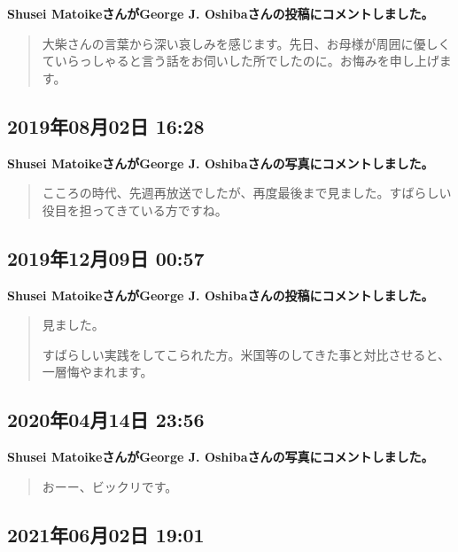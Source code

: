 \textbf{Shusei MatoikeさんがGeorge J. Oshibaさんの投稿にコメントしました。}

\begin{quote}
大柴さんの言葉から深い哀しみを感じます。先日、お母様が周囲に優しくていらっしゃると言う話をお伺いした所でしたのに。お悔みを申し上げます。
\end{quote}

\subsection*{2019年08月02日 16:28}

\textbf{Shusei MatoikeさんがGeorge J. Oshibaさんの写真にコメントしました。}

\begin{quote}
こころの時代、先週再放送でしたが、再度最後まで見ました。すばらしい役目を担ってきている方ですね。
\end{quote}

\subsection*{2019年12月09日 00:57}

\textbf{Shusei MatoikeさんがGeorge J. Oshibaさんの投稿にコメントしました。}

\begin{quote}
見ました。

すばらしい実践をしてこられた方。米国等のしてきた事と対比させると、一層悔やまれます。
\end{quote}

\subsection*{2020年04月14日 23:56}

\textbf{Shusei MatoikeさんがGeorge J. Oshibaさんの写真にコメントしました。}

\begin{quote}
おーー、ビックリです。
\end{quote}

\subsection*{2021年06月02日 19:01}

